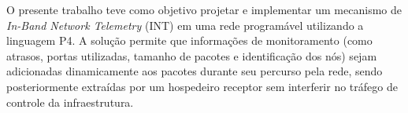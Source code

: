 O presente trabalho teve como objetivo projetar e implementar um mecanismo de \textit{In-Band Network Telemetry} (INT) em uma rede programável utilizando a linguagem P4. A solução permite que informações de monitoramento (como atrasos, portas utilizadas, tamanho de pacotes e identificação dos nós) sejam adicionadas dinamicamente aos pacotes durante seu percurso pela rede, sendo posteriormente extraídas por um hospedeiro receptor sem interferir no tráfego de controle da infraestrutura.
